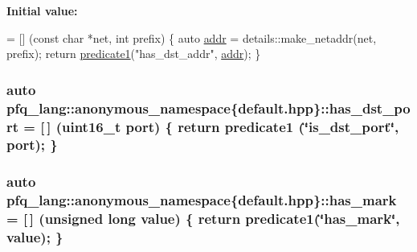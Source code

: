 {\bfseries Initial value\-:}
\begin{DoxyCode}
= [] (\textcolor{keyword}{const} \textcolor{keywordtype}{char} *net, \textcolor{keywordtype}{int} prefix)
        \{
            \textcolor{keyword}{auto} \hyperlink{namespacepfq__lang_1_1anonymous__namespace_02default_8hpp_03_aafce8334d1be83bff9a2115439c8c453}{addr} = details::make\_netaddr(net, prefix);
            \textcolor{keywordflow}{return} \hyperlink{namespacepfq__lang_ae23a03cee94b5ddfde4a8d2e5c521f0e}{predicate1}(\textcolor{stringliteral}{"has\_dst\_addr"}, \hyperlink{namespacepfq__lang_1_1anonymous__namespace_02default_8hpp_03_aafce8334d1be83bff9a2115439c8c453}{addr});
        \}
\end{DoxyCode}
\hypertarget{namespacepfq__lang_1_1anonymous__namespace_02default_8hpp_03_accc3aed36db0c762dd6c95f3706c8741}{
\subsubsection[{has\-\_\-dst\-\_\-port}]{\setlength{\rightskip}{0pt plus 5cm}auto pfq\-\_\-lang\-::anonymous\-\_\-namespace\{default.\-hpp\}\-::has\-\_\-dst\-\_\-port = \mbox{[}$\,$\mbox{]} (uint16\-\_\-t {\bf port}) \{ return {\bf predicate1} (\char`\"{}is\-\_\-dst\-\_\-port\char`\"{}, port); \}}}\label{namespacepfq__lang_1_1anonymous__namespace_02default_8hpp_03_accc3aed36db0c762dd6c95f3706c8741}
\hypertarget{namespacepfq__lang_1_1anonymous__namespace_02default_8hpp_03_a0f9dc3f39bf9793e766b6312718483f1}{
\subsubsection[{has\-\_\-mark}]{\setlength{\rightskip}{0pt plus 5cm}auto pfq\-\_\-lang\-::anonymous\-\_\-namespace\{default.\-hpp\}\-::has\-\_\-mark = \mbox{[}$\,$\mbox{]} (unsigned long value) \{ return {\bf predicate1}(\char`\"{}has\-\_\-mark\char`\"{}, value); \}}}\label{namespacepfq__lang_1_1anonymous__namespace_02default_8hpp_03_a0f9dc3f39bf9793e766b6312718483f1}

